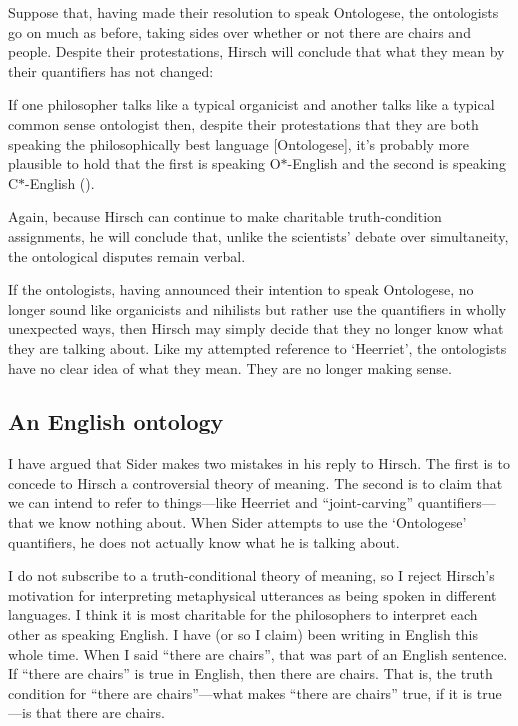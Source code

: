 \documentclass[11pt]{article}
\newenvironment{squote}{%
\begin{spacing}{1}
       	\begin{list}{}{%
\setlength{\labelwidth}{0pt}%
\rightmargin\leftmargin%
}
\item\relax
}{%
\end{list}%
\end{spacing}
}
\begin{document}
\begin{spacing}{1.25}
Suppose that, having made their resolution to speak Ontologese, the
ontologists go on much as before, taking sides over whether or not
there are chairs and people.  Despite their protestations, Hirsch will
conclude that what they mean by their quantifiers has not changed:

\begin{squote}
If one philosopher talks like a typical organicist and another talks
like a typical common sense ontologist then, despite their
protestations that they are both speaking the philosophically best
language [Ontologese], it's probably more plausible to hold that the
first is speaking O$\ast$-English and the second is speaking
C$\ast$-English (\citeyear[12]{hirsch2008}).
\end{squote}

Again, because Hirsch can continue to make charitable truth-condition
assignments, he will conclude that, unlike the scientists' debate over
simultaneity, the ontological disputes remain verbal.

If the ontologists, having announced their intention to speak
Ontologese, no longer sound like organicists and nihilists but rather
use the quantifiers in wholly unexpected ways, then Hirsch may simply
decide that they no longer know what they are talking about.  Like my
attempted reference to `Heerriet', the ontologists have no clear idea
of what they mean.  They are no longer making sense.

\subsection{An English ontology}
\label{english}
I have argued that Sider makes two mistakes in his reply to Hirsch.
The first is to concede to Hirsch a controversial theory of meaning.
The second is to claim that we can intend to refer to things---like
Heerriet and ``joint-carving'' quantifiers---that we know nothing
about.  When Sider attempts to use the `Ontologese' quantifiers, he
does not actually know what he is talking about.

I do not subscribe to a truth-conditional theory of meaning, so I
reject Hirsch's motivation for interpreting metaphysical utterances as
being spoken in different languages.  I think it is most charitable
for the philosophers to interpret each other as speaking English.  I
have (or so I claim) been writing in English this whole time.  When I
said ``there are chairs'', that was part of an English sentence.  If
``there are chairs'' is true in English, then there are chairs.  That
is, the truth condition for ``there are chairs''---what makes ``there
are chairs'' true, if it is true---is that there are chairs.


\end{spacing}
\end{document}
